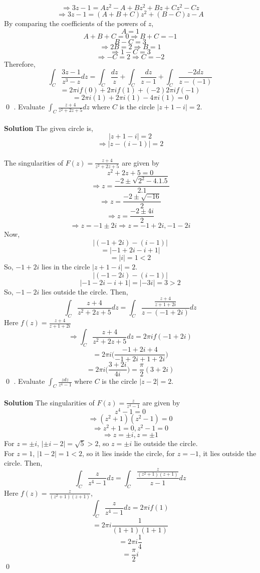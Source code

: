 \documentclass{article}
\begin{document}
\[
\Rightarrow 3z-1=Az^2-A+Bz^2+Bz+Cz^2-Cz
\]
\[
\Rightarrow 3z-1=(A+B+C)z^2+(B-C)z-A
\]
By comparing the coefficients of the powers of $z$,
\[
\boxed{A=1}
\]
\[
A+B+C=0 \Rightarrow B+C=-1
\]
\[
B-C=3
\]
\[
\Rightarrow 2B=2\Rightarrow \boxed{B=1}
\]
\[
\Rightarrow 1-C=3
\]
\[
\Rightarrow -C=2\Rightarrow \boxed{C=-2}
\]
Therefore,
\[
\int_{C}\frac{3z-1}{z^3-z}dz=\int_{C}\frac{dz}{z}+\int_{C}\frac{dz}{z-1}+\int_{C}\frac{-2dz}{z-(-1)}
\]
\[
=2\pi if(0)+2\pi if(1)+(-2)2\pi if(-1)
\]
\[
=2\pi i(1)+2\pi i(1)-4\pi i(1)=0
\]
\qed
{}. Evaluate $\displaystyle\int_{C}\frac{z+4}{z^2+2z+5}dz$ where $C$ is the circle $|z+1-i|=2$.
\\
\\
\textbf{Solution} The given circle is,
\[
|z+1-i|=2
\]
\[
\Rightarrow|z-(i-1)|=2
\]
\\
The singularities of $F(z)=\frac{z+4}{z^2+2z+5}$ are given by
\[
z^2+2z+5=0
\]
\[
\Rightarrow z=\frac{-2\pm\sqrt{2^2-4.1.5}}{2.1}
\]
\[
\Rightarrow z=\frac{-2\pm\sqrt{-16}}{2}
\]
\[
\Rightarrow z=\frac{-2\pm4i}{2}
\]
\[
\Rightarrow z=-1\pm 2i \Rightarrow z=-1+2i, -1-2i
\]
Now,
\[
|(-1+2i)-(i-1)|
\]
\[
=|-1+2i-i+1|
\]
\[
=|i|=1<2
\]
So, $-1+2i$ lies in the circle $|z+1-i|=2$.
\[
|(-1-2i)-(i-1)|
\]
\[
|-1-2i-i+1|=|-3i|=3>2
\]
So, $-1-2i$ lies outside the circle. Then,
\[
\int_{C}\frac{z+4}{z^2+2z+5}dz=\int_{C}\frac{\frac{z+4}{z+1+2i}}{z-(-1+2i)}dz
\]
Here $f(z)=\frac{z+4}{z+1+2i}$
\[
\Rightarrow \int_{C}\frac{z+4}{z^2+2z+5}dz=2\pi if(-1+2i)
\]
\[
=2\pi i\Big(\frac{-1+2i+4}{-1+2i+1+2i}\Big)
\]
\[
=2\pi i\Big(\frac{3+2i}{4i}\Big)=\frac{\pi}{2}(3+2i)
\]
\qed
{}. Evaluate $\displaystyle\int_{C}\frac{zdz}{z^4-1}$ where $C$ is the circle $|z-2|=2$.
\\
\\
\textbf{Solution} The singularities of $F(z)=\frac{z}{z^4-1}$ are given by
\[
z^4-1=0
\]
\[
\Rightarrow (z^2+1)(z^2-1)=0
\]
\[
\Rightarrow z^2+1=0, z^2-1=0
\]
\[
\Rightarrow z=\pm i,z=\pm 1
\]
For $z=\pm i$, $|\pm i-2|=\sqrt{5}>2$, so $z=\pm i$ lie outside the circle.
\\
For $z=1$, $|1-2|=1<2$, so it lies inside the circle, for $z=-1$, it lies outside the circle. Then,
\[
\int_{C}\frac{z}{z^4-1}dz=\int_{C}\frac{\frac{z}{(z^2+1)(z+1)}}{z-1}dz
\]
Here $f(z)=\frac{z}{(z^2+1)(z+1)}$,
\[
\int_{C}\frac{z}{z^4-1}dz=2\pi if(1)
\]
\[
=2\pi i\frac{1}{(1+1)(1+1)}
\]
\[
=2\pi i\frac{1}{4}
\]
\[
=\frac{\pi}{2}i
\]
\qed
\end{document}
